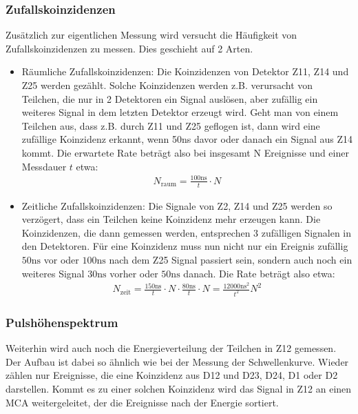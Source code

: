 \subsubsection{Zufallskoinzidenzen}
Zusätzlich zur eigentlichen Messung wird versucht die Häufigkeit von Zufallskoinzidenzen zu messen. Dies geschieht auf 2 Arten.
\begin{itemize}
	\item Räumliche Zufallskoinzidenzen: Die Koinzidenzen von Detektor Z11, Z14 und Z25 werden gezählt. Solche Koinzidenzen werden z.B. verursacht von Teilchen, die nur in 2 Detektoren ein Signal auslösen, aber zufällig ein weiteres Signal in dem letzten Detektor erzeugt wird. Geht man von einem Teilchen aus, dass z.B. durch Z11 und Z25 geflogen ist, dann wird eine zufällige Koinzidenz erkannt, wenn 50ns davor oder danach ein Signal aus Z14 kommt. Die erwartete Rate beträgt also bei insgesamt N Ereignisse und einer Messdauer $t$ etwa: 
\begin{align}
N_{\text{raum}} = \frac{100\si{\nano\second}}{t} \cdot N
\label{equ:random_space}
\end{align}

	\item Zeitliche Zufallskoinzidenzen: Die Signale von Z2, Z14 und Z25 werden so verzögert, dass ein Teilchen keine Koinzidenz mehr erzeugen kann. Die Koinzidenzen, die dann gemessen werden, entsprechen 3 zufälligen Signalen in den Detektoren. Für eine Koinzidenz muss nun nicht nur ein Ereignis zufällig $50\si{\nano \second}$ vor oder $100 \si{\nano \second}$ nach dem Z25 Signal passiert sein, sondern auch noch ein weiteres Signal $30\si{\nano \second}$ vorher oder $50\si{\nano \second}$ danach. Die Rate beträgt also etwa:
	\begin{align}
N_{\text{zeit}} = \frac{150\si{\nano\second}}{t} \cdot N \cdot \frac{80\si{\nano\second}}{t} \cdot N = \frac{12000 \si{\nano\second}^2}{t^2}N^2
\label{equ:random_time}
\end{align}

\end{itemize}

\subsubsection{Pulshöhenspektrum}
Weiterhin wird auch noch die Energieverteilung der Teilchen in Z12 gemessen. Der Aufbau ist dabei so ähnlich wie bei der Messung der Schwellenkurve. Wieder zählen nur Ereignisse, die eine Koinzidenz aus D12 und D23, D24, D1 oder D2 darstellen. Kommt es zu einer solchen Koinzidenz wird das Signal in Z12 an einen MCA weitergeleitet, der die Ereignisse nach der Energie sortiert.